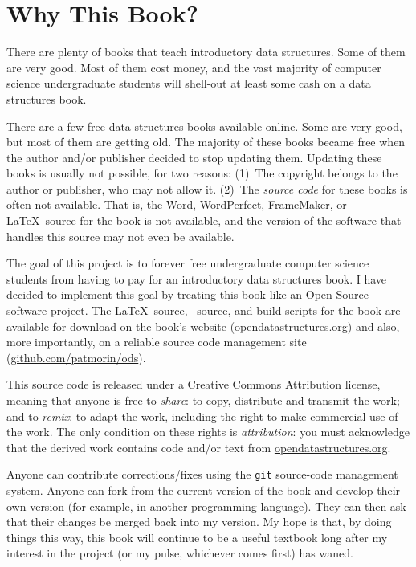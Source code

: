 \chapter*{Why This Book?}

There are plenty of books that teach introductory data structures.
Some of them are very good.  Most of them cost money, and the vast
majority of computer science undergraduate students will shell-out at
least some cash on a data structures book.

There are a few free data structures books available online.  Some are
very good, but most of them are getting old.  The majority of these
books became free when the author and/or publisher decided to stop
updating them.  Updating these books is usually not possible, for two
reasons:  (1)~The copyright belongs to the author or publisher, who
may not allow it.  (2)~The \emph{source code} for these books is often
not available.  That is, the Word, WordPerfect, FrameMaker, or \LaTeX\
source for the book is not available, and the version of the software
that handles this source may not even be available.

The goal of this project is to forever free undergraduate computer
science students from having to pay for an introductory data structures
book.  I have decided to implement this goal by treating this book
like an Open Source software project.  The \LaTeX\ source, \lang\
source, and build scripts for the book are available for download
on the book's website (\url{opendatastructures.org}) and also,
more importantly, on a reliable source code management site
(\url{github.com/patmorin/ods}).

This source code is released under a Creative Commons Attribution license,
meaning that anyone is free to \emph{share}: to copy, distribute and
transmit the work; and to \emph{remix}: to adapt the work, including the
right to make commercial use of the work.  The only condition on these
rights is \emph{attribution}: you must acknowledge that the derived work
contains code and/or text from \url{opendatastructures.org}.

Anyone can contribute corrections/fixes using the \texttt{git} source-code
management system.  Anyone can fork from the current version of the
book and develop their own version (for example, in another programming
language).  They can then ask that their changes be merged back into
my version.  My hope is that, by doing things this way, this book will
continue to be a useful textbook long after my interest in the project
(or my pulse, whichever comes first) has waned.


